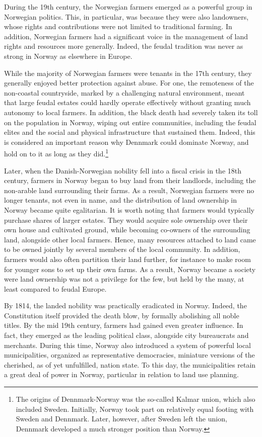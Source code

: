 During the 19th century, the Norwegian farmers emerged as a powerful group in Norwegian politics. This, in particular, was because they were also landowners, whose rights and contributions were not limited to traditional farming. In addition, Norwegian farmers had a significant voice in the management of land rights and resources more generally. Indeed, the feudal tradition was never as strong in Norway as elsewhere in Europe. 

While the majority of Norwegian farmers were tenants in the 17th century, they generally enjoyed better protection against abuse. For one, the remoteness of the non-coastal countryside, marked by a challenging natural environment, meant that large feudal estates could hardly operate effectively without granting much autonomy to local farmers. In addition, the black death had severely taken its toll on the population in Norway, wiping out entire communities, including the feudal elites and the social and physical infrastructure that sustained them. Indeed, this is considered an important reason why Dennmark could dominate Norway, and hold on to it as long as they did.\footnote{The origins of Dennmark-Norway was the so-called Kalmar union, which also included Sweden. Initially, Norway took part on relatively equal footing with Sweden and Dennmark. Later, however, after Sweden left the union, Dennmark developed a much stronger position than Norway.}

Later, when the Danish-Norwegian nobility fell into a fiscal crisis in the 18th century, farmers in Norway began to buy land from their landlords, including the non-arable land surrounding their farms. As a result, Norwegian farmers were no longer tenants, not even in name, and the distribution of land ownership in Norway became quite egalitarian. It is worth noting that farmers would typically purchase shares of larger estates. They would acquire sole ownership over their own house and cultivated ground, while becoming co-owners of the surrounding land, alongside other local farmers. Hence, many resources attached to land came to be owned jointly by several members of the local community. In addition, farmers would also often partition their land further, for instance to make room for younger sons to set up their own farms. As a result, Norway became a society were land ownership was not a privilege for the few, but held by the many, at least compared to feudal Europe.

By 1814, the landed nobility was practically eradicated in Norway. Indeed, the Constitution itself provided the death blow, by formally abolishing all noble titles. By the mid 19th century, farmers had gained even greater influence. In fact, they emerged as the leading political class, alongside city bureaucrats and merchants. During this time, Norway also introduced a system of powerful local municipalities, organized as representative democracies, miniature versions of the cherished, as of yet unfulfilled, nation state. To this day, the municipalities retain a great deal of power in Norway, particular in relation to land use planning.

